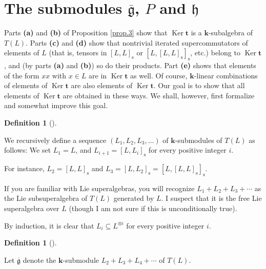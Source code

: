 \documentclass[numbers=enddot,12pt,final,onecolumn,notitlepage]{scrartcl}%
\theoremstyle{definition}
\newtheorem{defi}[theo]{Definition}
\newenvironment{definition}[1][]
{\begin{defi}[#1]\begin{leftbar}}
{\end{leftbar}\end{defi}}
\begin{document}
\section{The submodules $\overline{\mathfrak{g}}$, $P$ and $\mathfrak{h}$}

Parts \textbf{(a)} and \textbf{(b)} of Proposition \ref{prop.3} show that
$\operatorname*{Ker}\mathbf{t}$ is a $\mathbf{k}$-subalgebra of $T\left(
L\right)  $. Parts \textbf{(c)} and \textbf{(d)} show that nontrivial iterated
supercommutators of elements of $L$ (that is, tensors in $\left[  L,L\right]
_{\operatorname*{s}}$ or $\left[  L,\left[  L,L\right]  _{\operatorname*{s}%
}\right]  _{\operatorname*{s}}$, etc.) belong to $\operatorname*{Ker}%
\mathbf{t}$, and (by parts \textbf{(a)} and \textbf{(b)}) so do their
products. Part \textbf{(e)} shows that elements of the form $xx$ with $x\in L$
are in $\operatorname*{Ker}\mathbf{t}$ as well. Of course, $\mathbf{k}$-linear
combinations of elements of $\operatorname*{Ker}\mathbf{t}$ are also elements
of $\operatorname*{Ker}\mathbf{t}$. Our goal is to show that all elements of
$\operatorname*{Ker}\mathbf{t}$ are obtained in these ways. We shall, however,
first formalize and somewhat improve this goal.

\begin{definition}
We recursively define a sequence $\left(  L_{1},L_{2},L_{3},\ldots\right)  $
of $\mathbf{k}$-submodules of $T\left(  L\right)  $ as follows: We set
$L_{1}=L$, and $L_{i+1}=\left[  L,L_{i}\right]  _{\operatorname*{s}}$ for
every positive integer $i$.
\end{definition}

For instance, $L_{2}=\left[  L,L\right]  _{\operatorname*{s}}$ and
$L_{3}=\left[  L,L_{2}\right]  _{\operatorname*{s}}=\left[  L,\left[
L,L\right]  _{\operatorname*{s}}\right]  _{\operatorname*{s}}$.

If you are familiar with Lie superalgebras, you will recognize $L_{1}%
+L_{2}+L_{3}+\cdots$ as the Lie subsuperalgebra of $T\left(  L\right)  $
generated by $L$. I suspect that it is the free Lie superalgebra over $L$
(though I am not sure if this is unconditionally true).

By induction, it is clear that $L_{i}\subseteq L^{\otimes i}$ for every
positive integer $i$.

\begin{definition}
Let $\overline{\mathfrak{g}}$ denote the $\mathbf{k}$-submodule $L_{2}%
+L_{3}+L_{4}+\cdots$ of $T\left(  L\right)  $.
\end{definition}
\end{document}
